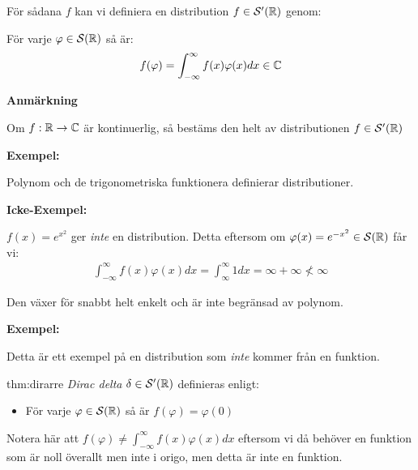 \par\bigskip
\noindent För sådana $f$ kan vi definiera en distribution $f\in\mathcal{S}^{\prime}(\mathbb{R})$ genom:\par
För varje $\varphi\in\mathcal{S}(\mathbb{R})$ så är:
\begin{equation*}
  \begin{gathered}
    f(\varphi) = \int_{-\infty}^{\infty}f(x)\varphi(x)dx\in\mathbb{C}
  \end{gathered}
\end{equation*}
\par\bigskip
\noindent\textbf{Anmärkning}\par
\noindent Om $f:\mathbb{R}\to\mathbb{C}$ är kontinuerlig, så bestäms den helt av distributionen $f\in\mathcal{S}^{\prime}(\mathbb{R})$ 
\par\bigskip
\noindent\textbf{Exempel:}\par
\noindent Polynom och de trigonometriska funktionera definierar distributioner.
\par\bigskip
\noindent\textbf{Icke-Exempel:}\par
\noindent $f(x) = e^{x^2}$ ger \textit{inte} en distribution. Detta eftersom om $\varphi(x) = e^{-x^2}\in\mathcal{S}(\mathbb{R})$ får vi:
\begin{equation*}
  \begin{gathered}
    \int_{-\infty}^{\infty}f(x)\varphi(x)dx = \int_{\infty}^{\infty}1dx = \infty+\infty \not<\infty
  \end{gathered}
\end{equation*}
\par\bigskip
\noindent Den växer för snabbt helt enkelt och är inte begränsad av polynom.
\par\bigskip
\noindent\textbf{Exempel:}\par
\noindent Detta är ett exempel på en distribution som \textit{inte} kommer från en funktion.
\par\bigskip
\begin{theo}{thm:dirarre}
  \textit{Dirac delta} $\delta\in\mathcal{S}^{\prime}(\mathbb{R})$ definieras enligt:\par
  \begin{itemize}
    \item För varje $\varphi\in\mathcal{S}(\mathbb{R})$ så är $f(\varphi) = \varphi(0)$
  \end{itemize}
  \par\bigskip
  \noindent Notera här att $f(\varphi)\neq\int_{-\infty}^{\infty}f(x)\varphi(x)dx$ eftersom vi då behöver en funktion som är noll överallt men inte i origo, men detta är inte en funktion.
\end{theo}
